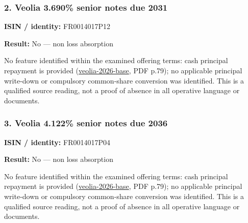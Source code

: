 \documentclass[
  11pt,
]{article}
\begin{document}
\begin{minipage}{\linewidth}

\hypertarget{veolia-3.690-senior-notes-due-2031}{%
\subsubsection{2. Veolia 3.690\% senior notes due
2031}\label{veolia-3.690-senior-notes-due-2031}}

\textbf{ISIN / identity:} FR0014017P12

\textbf{Result:} No --- non loss absorption

No feature identified within the examined offering terms: cash principal
repayment is provided
(\href{https://www.veolia.com/sites/g/files/dvc4206/files/document/2026/03/Finance_Veolia_Environnement_base_prospectus_EMTN_update_03-30-2026.pdf}{veolia-2026-base},
PDF p.79); no applicable principal write-down or compulsory common-share
conversion was identified. This is a qualified source reading, not a
proof of absence in all operative language or documents.

\end{minipage}
\par\addvspace{1.1em}

\begin{minipage}{\linewidth}

\hypertarget{veolia-4.122-senior-notes-due-2036}{%
\subsubsection{3. Veolia 4.122\% senior notes due
2036}\label{veolia-4.122-senior-notes-due-2036}}

\textbf{ISIN / identity:} FR0014017P04

\textbf{Result:} No --- non loss absorption

No feature identified within the examined offering terms: cash principal
repayment is provided
(\href{https://www.veolia.com/sites/g/files/dvc4206/files/document/2026/03/Finance_Veolia_Environnement_base_prospectus_EMTN_update_03-30-2026.pdf}{veolia-2026-base},
PDF p.79); no applicable principal write-down or compulsory common-share
conversion was identified. This is a qualified source reading, not a
proof of absence in all operative language or documents.

\end{minipage}
\par\addvspace{1.1em}
\end{document}
